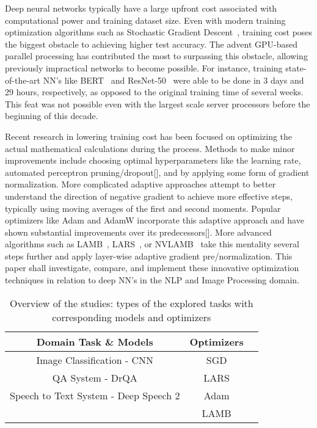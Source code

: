 Deep neural networks typically have a large upfront cost associated with computational power and training dataset size. Even with modern training optimization algorithms such as Stochastic Gradient Descent~\cite{SGD}, training cost poses the biggest obstacle to achieving higher test accuracy. The advent GPU-based parallel processing has contributed the most to surpassing this obstacle, allowing previously impractical networks to become possible. For instance, training state-of-the-art NN's like BERT~\cite{bert} and ResNet-50~\cite{resnet} were able to be done in 3 days and 29 hours, respectively, as opposed to the original training time of several weeks. This feat was not possible even with the largest scale server processors before the beginning of this decade. 

Recent research in lowering training cost has been focused on optimizing the actual mathematical calculations during the process. Methods to make minor improvements include choosing optimal hyperparameters like the learning rate, automated perceptron pruning/dropout[], and by applying some form of gradient normalization. More complicated adaptive approaches attempt to better understand the direction of negative gradient to achieve more effective steps, typically using moving averages of the first and second moments. Popular optimizers like Adam and AdamW incorporate this adaptive approach and have shown substantial improvements over its predecessors[]. More advanced algorithms such as LAMB~\cite{You2020Large}, LARS~\cite{qian2020impact, ginsburg2018large}, or NVLAMB~\cite{nvidia_nvlamb}  take this mentality several steps further and apply layer-wise adaptive gradient pre/normalization. This paper shall investigate, compare, and implement these innovative optimization techniques in relation to deep NN's in the NLP and Image Processing domain. 


\begin{table}[t]
\centering
\caption{Overview of the studies: types of the explored tasks with corresponding models and optimizers}
\label{tab:LargeBatch}
\begin{tabular}{ccc} 
 \toprule
\textbf{Domain Task \& Models} & \textbf{Optimizers} \\
 \midrule
  Image Classification - CNN \cite{} & SGD \cite{} \\
  QA System - DrQA \cite{} & LARS \cite{} \\ 
  Speech to Text System - Deep Speech 2 \cite{} & Adam \cite{} \\
  &  LAMB \cite{} \\
  \bottomrule
\end{tabular}
\end{table}

